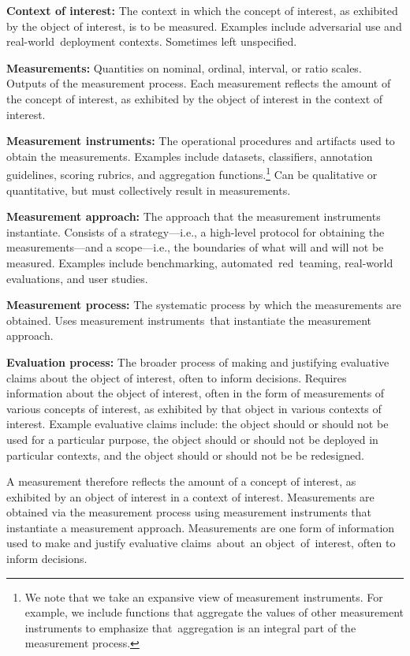 \documentclass{article}
\begin{document}
\textbf{Context of interest:} The context in which the concept of interest, as exhibited by the object of interest, is to be measured. Examples include adversarial use and real-world~deployment contexts. Sometimes left unspecified.

\textbf{Measurements:} Quantities on nominal, ordinal, interval, or ratio scales. Outputs of the measurement process. Each measurement reflects the amount of the concept of interest, as exhibited by the object of interest in the context of interest.

\textbf{Measurement instruments:} The operational procedures and artifacts used to obtain the measurements. Examples include datasets, classifiers,
annotation guidelines, scoring rubrics, and aggregation functions.\footnote{We note that we take an expansive view of measurement instruments. For example, we include functions that aggregate the values of other measurement instruments to emphasize that~aggregation is an integral part of the measurement process.} Can be qualitative or quantitative, but must collectively result in measurements.

\textbf{Measurement approach:} The approach that the measurement instruments instantiate. Consists of a strategy---i.e., a high-level protocol for obtaining the measurements---and a scope---i.e., the boundaries of what will and will not be measured. Examples include benchmarking, automated~red~teaming, real-world evaluations, and user studies.

\textbf{Measurement process:} The systematic process by which the measurements are obtained. Uses measurement instruments~that instantiate the measurement approach.

\textbf{Evaluation process:} The broader process of making and justifying evaluative claims about the object of interest, often to inform decisions. Requires information about the object of interest, often in the form of measurements of various concepts of interest, as exhibited by that object in various contexts of interest. Example evaluative claims include: the object should or should not be used for a particular purpose, the object should or should not be deployed in particular contexts, and the object should or should not be be redesigned.

A measurement therefore reflects the amount of a concept of interest, as exhibited by an object of interest in a context of interest. Measurements are obtained via the measurement process using measurement instruments that instantiate a measurement approach. Measurements are one form of information used to make and justify evaluative claims~about~an object~of~interest, often to inform decisions.
\end{document}
